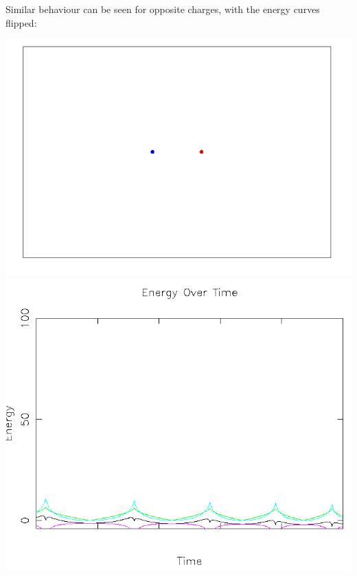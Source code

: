 \documentclass{article}
\begin{document}
Similar behaviour can be seen for opposite charges, with the energy curves flipped:
\\
\begin{center}
    \includegraphics[scale=0.5]{charged_2_opp}
    \includegraphics[scale=0.5]{charged_2_opp_energy}
\end{center}
\end{document}
